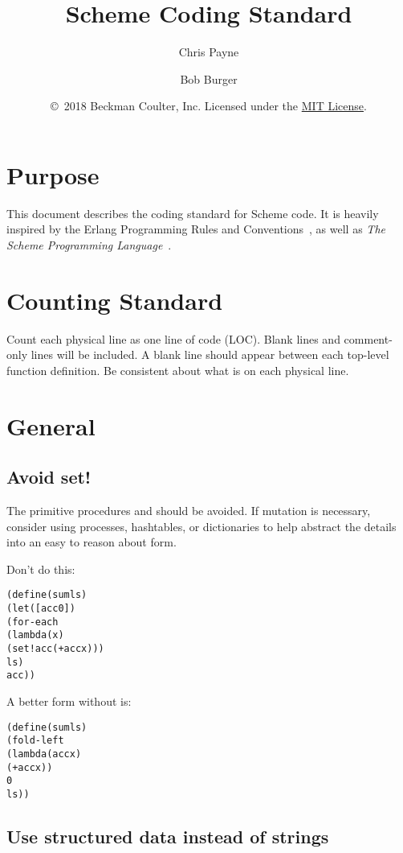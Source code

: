 \documentclass[letterpaper,11pt,twoside,final]{article}
\begin{document}
\title {Scheme Coding Standard}
\author {Chris Payne \and Bob Burger}
\date {\copyright\ 2018 Beckman Coulter, Inc.
  Licensed under the \href{https://opensource.org/licenses/MIT}{MIT License}.}
\coverpage

\section* {Purpose}

This document describes the coding standard for Scheme code.  It is
heavily inspired by the Erlang Programming Rules and
Conventions~\cite{erlang-programming-rules}, as well as \emph{The
  Scheme Programming Language}~\cite{the-scheme-programming-language}.

\section* {Counting Standard}

Count each physical line as one line of code (LOC). Blank lines and
comment-only lines will be included. A blank line should appear
between each top-level function definition. Be consistent about what
is on each physical line.

\section* {General}

\subsection* {Avoid set!}

The primitive procedures  and  should
be avoided. If mutation is necessary, consider using processes,
hashtables, or dictionaries to help abstract the details into an easy
to reason about form.

Don't do this:
\antipar
\begin{alltt}
(define (sum ls)
  (let ([acc 0])
    (for-each
     (lambda (x)
       (set! acc (+ acc x)))
     ls)
    acc))
\end{alltt}

A better form without  is:
\antipar
\begin{alltt}
(define (sum ls)
  (fold-left
   (lambda (acc x)
     (+ acc x))
   0
   ls))
\end{alltt}

\subsection* {Use structured data instead of strings}
\end{document}
